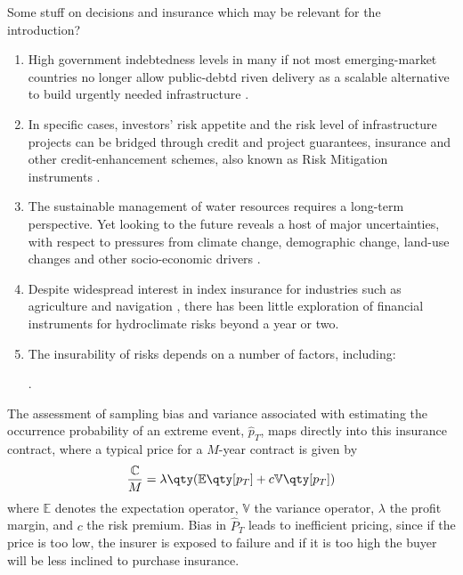 \documentclass[11pt]{article}
\begin{document}
Some stuff on decisions and insurance which may be relevant for the introduction?
\begin{enumerate}
  \item High government indebtedness levels in many if not most emerging-market countries no longer allow public-debtd riven delivery as a scalable alternative to build urgently needed infrastructure \citep{WEF-instruments-2016}.
  \item In specific cases, investors' risk appetite and the risk level of infrastructure projects can be bridged through credit and project guarantees, insurance and other credit-enhancement schemes, also known as Risk Mitigation instruments \citep{WEF-instruments-2016}.
  \item The sustainable management of water resources requires a long-term perspective.
  Yet looking to the future reveals a host of major uncertainties, with respect to pressures from climate change, demographic change, land-use changes and other socio-economic drivers \citep{Hall2012}.
  \item Despite widespread interest in index insurance for industries such as agriculture \citep{Clarke2013} and navigation \citep{Meyer2016}, there has been little exploration of financial instruments for hydroclimate risks beyond a year or two.
  \item The insurability of risks depends on a number of factors, including:
   \citep{Wolfrom2016}.
\end{enumerate}

The assessment of sampling bias and variance associated with estimating the occurrence probability of an extreme event, $\hat{p}_T$, maps directly into this insurance contract, where a typical price for a $M$-year contract is given by
\begin{equation}\label{eq:insurance-price}
  \frac{\mathbb{C}}{M} = \lambda \qty(\mathbb{E} \qty[p_T] + c \mathbb{V} \qty[p_T])
\end{equation}
where $\mathbb{E}$ denotes the expectation operator, $\mathbb{V}$ the variance operator, $\lambda$ the profit margin, and $c$ the risk premium.
Bias in $\hat{P}_T$ leads to inefficient pricing, since if the price is too low, the insurer is exposed to failure and if it is too high the buyer will be less inclined to purchase insurance.
\end{document}
